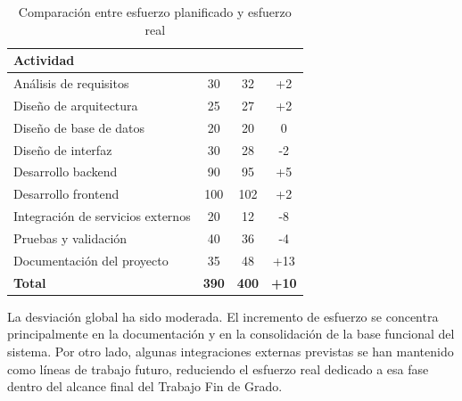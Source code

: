 \begin{table}[htbp]
    \centering
    \small
    \caption{Comparación entre esfuerzo planificado y esfuerzo real}
    \label{tab:project-plan-effort}
    \begin{tabularx}{\textwidth}{|Y|c|c|c|}
        \hline
        \textbf{Actividad} & \textbf{} & \textbf{} & \textbf{} \\
        \hline
        Análisis de requisitos & 30 & 32 & +2 \\
        \hline
        Diseño de arquitectura & 25 & 27 & +2 \\
        \hline
        Diseño de base de datos & 20 & 20 & 0 \\
        \hline
        Diseño de interfaz & 30 & 28 & -2 \\
        \hline
        Desarrollo backend & 90 & 95 & +5 \\
        \hline
        Desarrollo frontend & 100 & 102 & +2 \\
        \hline
        Integración de servicios externos & 20 & 12 & -8 \\
        \hline
        Pruebas y validación & 40 & 36 & -4 \\
        \hline
        Documentación del proyecto & 35 & 48 & +13 \\
        \hline
        \textbf{Total} & \textbf{390} & \textbf{400} & \textbf{+10} \\
        \hline
    \end{tabularx}
\end{table}

La desviación global ha sido moderada. El incremento de esfuerzo se concentra principalmente en la documentación y en la consolidación de la base funcional del sistema. Por otro lado, algunas integraciones externas previstas se han mantenido como líneas de trabajo futuro, reduciendo el esfuerzo real dedicado a esa fase dentro del alcance final del Trabajo Fin de Grado.
